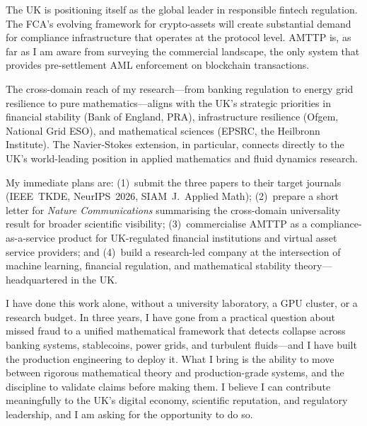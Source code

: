 \documentclass[12pt,a4paper]{article}
\begin{document}
The UK is positioning itself as the global leader in responsible fintech
regulation.  The FCA's evolving framework for crypto-assets will create
substantial demand for compliance infrastructure that operates at the
protocol level.  AMTTP is, as far as I am aware from surveying the
commercial landscape, the only system that provides pre-settlement AML
enforcement on blockchain transactions.

The cross-domain reach of my research---from banking regulation to energy
grid resilience to pure mathematics---aligns with the UK's strategic
priorities in financial stability (Bank of England, PRA), infrastructure
resilience (Ofgem, National Grid ESO), and mathematical sciences (EPSRC,
the Heilbronn Institute).  The Navier-Stokes extension, in particular,
connects directly to the UK's world-leading position in applied
mathematics and fluid dynamics research.

My immediate plans are: (1)~submit the three papers to their target
journals (IEEE~TKDE, NeurIPS~2026, SIAM~J.~Applied Math);
(2)~prepare a short letter for \textit{Nature Communications}
summarising the cross-domain universality result for broader scientific
visibility; (3)~commercialise AMTTP as a compliance-as-a-service product
for UK-regulated financial institutions and virtual asset service
providers; and (4)~build a research-led company at the intersection of
machine learning, financial regulation, and mathematical stability
theory---headquartered in the UK.


\medskip

I have done this work alone, without a university laboratory, a GPU
cluster, or a research budget.  In three years, I have gone from a
practical question about missed fraud to a unified mathematical framework
that detects collapse across banking systems, stablecoins, power grids,
and turbulent fluids---and I have built the production engineering to
deploy it.  What I bring is the ability to move between rigorous
mathematical theory and production-grade systems, and the discipline to
validate claims before making them.  I believe I can contribute
meaningfully to the UK's digital economy, scientific reputation, and
regulatory leadership, and I am asking for the opportunity to do so.
\end{document}
